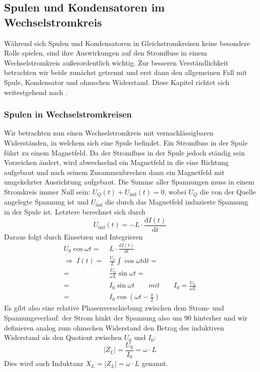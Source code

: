 
\subsection{Spulen und Kondensatoren im Wechselstromkreis}
Während sich Spulen und Kondensatoren in Gleichstromkreisen keine besondere Rolle spielen, sind ihre Auswirkungen auf den Stromfluss in einem Wechselstromkreis außerordentlich wichtig. Zur besseren Verständlichkeit betrachten wir beide zunächst getrennt und erst dann den allgemeinen Fall mit Spule, Kondensator und ohmschen Widerstand. Diese Kapitel richtet sich weitestgehend nach \cite{Demtroeder}.

\subsubsection{Spulen in Wechselstromkreisen}
Wir betrachten nun einen Wechselstromkreis mit vernachlässigbaren Widerständen, in welchem sich eine Spule befindet. Ein Stromfluss in der Spule führt zu einem Magnetfeld. Da der Stromfluss in der Spule jedoch ständig sein Vorzeichen ändert, wird abwechselnd ein Magnetfeld in die eine Richtung aufgebaut und nach seinem Zusammenbrechen dann ein Magnetfeld mit umgekehrter Ausrichtung aufgebaut.
Die Summe aller Spannungen muss in einem Stromkreis immer Null sein:
$ U_Q(t) + U_\mathrm{ind}(t) = 0 $,
wobei $U_Q$ die von der Quelle angelegte Spannung ist und $U_\mathrm{ind}$ die durch das Magnetfeld induzierte Spannung in der Spule ist. Letztere berechnet sich durch
\begin{equation}
U_\mathrm{ind}(t) = - L \cdot \frac{\mathrm dI(t)}{\mathrm dt}
\end{equation}
Daraus folgt durch Einsetzen und Integrieren
\begin{align}
U_0 \cos \omega t =& L \cdot \frac{\mathrm dI(t)}{\mathrm dt} \nonumber \\ 
\Rightarrow\; I(t) =& \frac{U_0}{L} \int \cos \omega t \mathrm dt = \nonumber \\ 
=& \frac{U_0}{\omega L} \sin \omega t = \nonumber\\
=& I_0 \sin \omega t \qquad mit\qquad I_0 = \frac{U_0}{\omega L}  \nonumber\\
=& I_0 \cos(\omega t - \frac{\pi}{2})
\end{align}
Es gibt also eine relative Phasenverschiebung zwischen dem Strom- und Spannungsverlauf: der Strom hinkt der Spannung also um \unit{90}{\degree} hinterher und wir definieren analog zum ohmschen Widerstand den Betrag des induktiven Widerstand als den Quotient zwischen $U_0$ und $I_0$:
\begin{equation}
\left|Z_L\right| = \frac{U_0}{I_0} = \omega \cdot L
\end{equation}
Dies wird auch Induktanz $X_L = \left|Z_L\right| = \omega \cdot L$ genannt.

